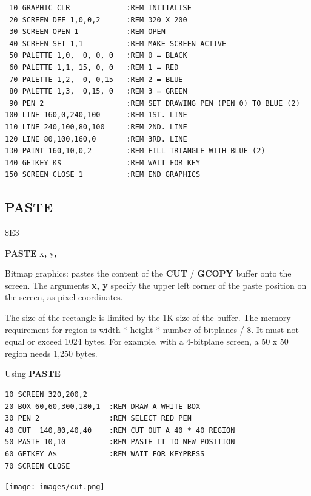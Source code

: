 \begin{description}[leftmargin=2cm,style=nextline]
\begin{tcolorbox}[colback=black,coltext=white]
\verbatimfont{\codefont}
\begin{verbatim}
 10 GRAPHIC CLR             :REM INITIALISE
 20 SCREEN DEF 1,0,0,2      :REM 320 X 200
 30 SCREEN OPEN 1           :REM OPEN
 40 SCREEN SET 1,1          :REM MAKE SCREEN ACTIVE
 50 PALETTE 1,0,  0, 0, 0   :REM 0 = BLACK
 60 PALETTE 1,1, 15, 0, 0   :REM 1 = RED
 70 PALETTE 1,2,  0, 0,15   :REM 2 = BLUE
 80 PALETTE 1,3,  0,15, 0   :REM 3 = GREEN
 90 PEN 2                   :REM SET DRAWING PEN (PEN 0) TO BLUE (2)
100 LINE 160,0,240,100      :REM 1ST. LINE
110 LINE 240,100,80,100     :REM 2ND. LINE
120 LINE 80,100,160,0       :REM 3RD. LINE
130 PAINT 160,10,0,2        :REM FILL TRIANGLE WITH BLUE (2)
140 GETKEY K$               :REM WAIT FOR KEY
150 SCREEN CLOSE 1          :REM END GRAPHICS
\end{verbatim}
\end{tcolorbox}
\end{description}


\newpage
\subsection{PASTE}
\begin{description}[leftmargin=2cm,style=nextline]
\item [Token:] \$E3
\item [Format:] {\bf PASTE} x{\bf,} y{\bf,}
\item [Usage:] Bitmap graphics: pastes the content
               of the {\bf CUT} / {\bf GCOPY} buffer onto the screen.
               The arguments {\bf x, y} specify the upper left corner of the paste position on the screen, as pixel coordinates.

\item [Remarks:] The size of the rectangle is limited by the 1K size of
                 the buffer. The memory requirement for
                 region is width * height * number of bitplanes / 8.
                 It must not equal or exceed 1024 bytes.
                 For example, with a 4-bitplane screen, a 50 x 50 region
                 needs 1,250 bytes.

\item [Example:] Using {\bf PASTE}
\begin{tcolorbox}[colback=black,coltext=white]
\verbatimfont{\codefont}
\begin{verbatim}
10 SCREEN 320,200,2
20 BOX 60,60,300,180,1  :REM DRAW A WHITE BOX
30 PEN 2                :REM SELECT RED PEN
40 CUT  140,80,40,40    :REM CUT OUT A 40 * 40 REGION
50 PASTE 10,10          :REM PASTE IT TO NEW POSITION
60 GETKEY A$            :REM WAIT FOR KEYPRESS
70 SCREEN CLOSE
\end{verbatim}
\end{tcolorbox}
\item \begin{center}\texttt{[image: images/cut.png]}\end{center}
\end{description}

